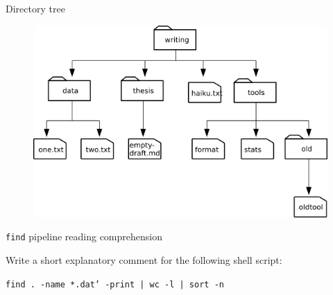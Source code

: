 \documentclass{beamer}
\begin{document}
\begin{frame}{Directory tree}

\begin{figure}
\includegraphics[width=1\textwidth]{../fig/find-file-tree.png}
\end{figure}


\end{frame}


\begin{frame}{\texttt{find} pipeline reading comprehension}

Write a short explanatory comment for the following shell script:
\vspace{0.5cm}

\begin{beamerboxesrounded}[upper=uppercolgreen,lower=lowercolgreen,shadow=false]{}
\texttt{find . -name *.dat' -print | wc -l | sort -n}
\end{beamerboxesrounded}


\end{frame}

\end{document}
